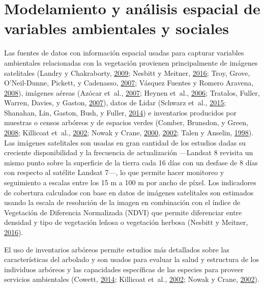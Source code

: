 \documentclass[12pt,a4paper,oneside, openany]{book}
\theoremstyle{definition}
\theoremstyle{definition}
\theoremstyle{definition}
\theoremstyle{remark}
\begin{document}
\section{Modelamiento y análisis espacial de variables ambientales y
sociales}\label{modelamiento-y-anuxe1lisis-espacial-de-variables-ambientales-y-sociales}

Las fuentes de datos con información espacial usadas para capturar
variables ambientales relacionadas con la vegetación provienen
principalmente de imágenes satelitales (Landry y Chakraborty,
\protect\hyperlink{ref-landry_street_2009}{2009}; Nesbitt y Meitner,
\protect\hyperlink{ref-nesbitt_exploring_2016}{2016}; Troy, Grove,
O'Neil-Dunne, Pickett, y Cadenasso,
\protect\hyperlink{ref-troy_predicting_2007}{2007}; Vásquez Fuentes y
Romero Aravena,
\protect\hyperlink{ref-vasquez_fuentes_vegetacion_2008}{2008}), imágenes
aéreas (Azócar et~al.,
\protect\hyperlink{ref-azocar_urbanization_2007}{2007}; Heynen et~al.,
\protect\hyperlink{ref-heynen_political_2006}{2006}; Tratalos, Fuller,
Warren, Davies, y Gaston,
\protect\hyperlink{ref-tratalos_urban_2007}{2007}), datos de Lidar
(Schwarz et~al., \protect\hyperlink{ref-schwarz_trees_2015}{2015};
Shanahan, Lin, Gaston, Bush, y Fuller,
\protect\hyperlink{ref-shanahan_socio-economic_2014}{2014}) e
inventarios producidos por muestras o censos arbóreos y de espacios
verdes (Comber, Brunsdon, y Green,
\protect\hyperlink{ref-comber_using_2008}{2008}; Killicoat et~al.,
\protect\hyperlink{ref-killicoat_economic_2002}{2002}; Nowak y Crane,
\protect\hyperlink{ref-nowak_urban_2000}{2000},
\protect\hyperlink{ref-nowak_carbon_2002}{2002}; Talen y Anselin,
\protect\hyperlink{ref-talen_assessing_1998}{1998}). Las imágenes
satelitales son usadas en gran cantidad de los estudios dadas su
creciente disponibilidad y la frecuencia de actualización ---Landsat 8
revisita un mismo punto sobre la superficie de la tierra cada 16 días
con un desfase de 8 días con respecto al satélite Landsat 7---, lo que
permite hacer monitoreo y seguimiento a escalas entre los 15 m a 100 m
por ancho de píxel. Los indicadores de cobertura calculados con base en
datos de imágenes satelitales son estimados usando la escala de
resolución de la imagen en combinación con el índice de Vegetación de
Diferencia Normalizada (NDVI) que permite diferenciar entre densidad y
tipo de vegetación leñosa o vegetación herbosa (Nesbitt y Meitner,
\protect\hyperlink{ref-nesbitt_exploring_2016}{2016}).

El uso de inventarios arbóreos permite estudios más detallados sobre las
características del arbolado y son usados para evaluar la salud y
estructura de los individuos arbóreos y las capacidades específicas de
las especies para proveer servicios ambientales (Cowett,
\protect\hyperlink{ref-cowett_methodology_2014}{2014}; Killicoat et~al.,
\protect\hyperlink{ref-killicoat_economic_2002}{2002}; Nowak y Crane,
\protect\hyperlink{ref-nowak_carbon_2002}{2002}).
\end{document}
